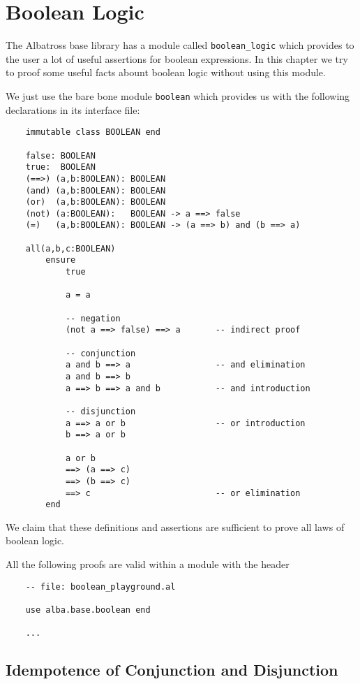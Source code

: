 \section{Boolean Logic}

The Albatross base library has a module called \lstinline!boolean_logic! which
provides to the user a lot of useful assertions for boolean expressions. In
this chapter we try to proof some useful facts abount boolean logic without
using this module.

We just use the bare bone module \lstinline!boolean! which provides us with
the following declarations in its interface file:

\begin{lstlisting}
    immutable class BOOLEAN end

    false: BOOLEAN
    true:  BOOLEAN
    (==>) (a,b:BOOLEAN): BOOLEAN
    (and) (a,b:BOOLEAN): BOOLEAN
    (or)  (a,b:BOOLEAN): BOOLEAN
    (not) (a:BOOLEAN):   BOOLEAN -> a ==> false
    (=)   (a,b:BOOLEAN): BOOLEAN -> (a ==> b) and (b ==> a)

    all(a,b,c:BOOLEAN)
        ensure
            true

            a = a

            -- negation
            (not a ==> false) ==> a       -- indirect proof

            -- conjunction
            a and b ==> a                 -- and elimination
            a and b ==> b
            a ==> b ==> a and b           -- and introduction

            -- disjunction
            a ==> a or b                  -- or introduction
            b ==> a or b

            a or b
            ==> (a ==> c)
            ==> (b ==> c)
            ==> c                         -- or elimination
        end
\end{lstlisting}

We claim that these definitions and assertions are sufficient to prove all
laws of boolean logic.

All the following proofs are valid within a module with the header
\begin{lstlisting}
    -- file: boolean_playground.al

    use alba.base.boolean end

    ...
\end{lstlisting}

\subsection{Idempotence of Conjunction and Disjunction}

